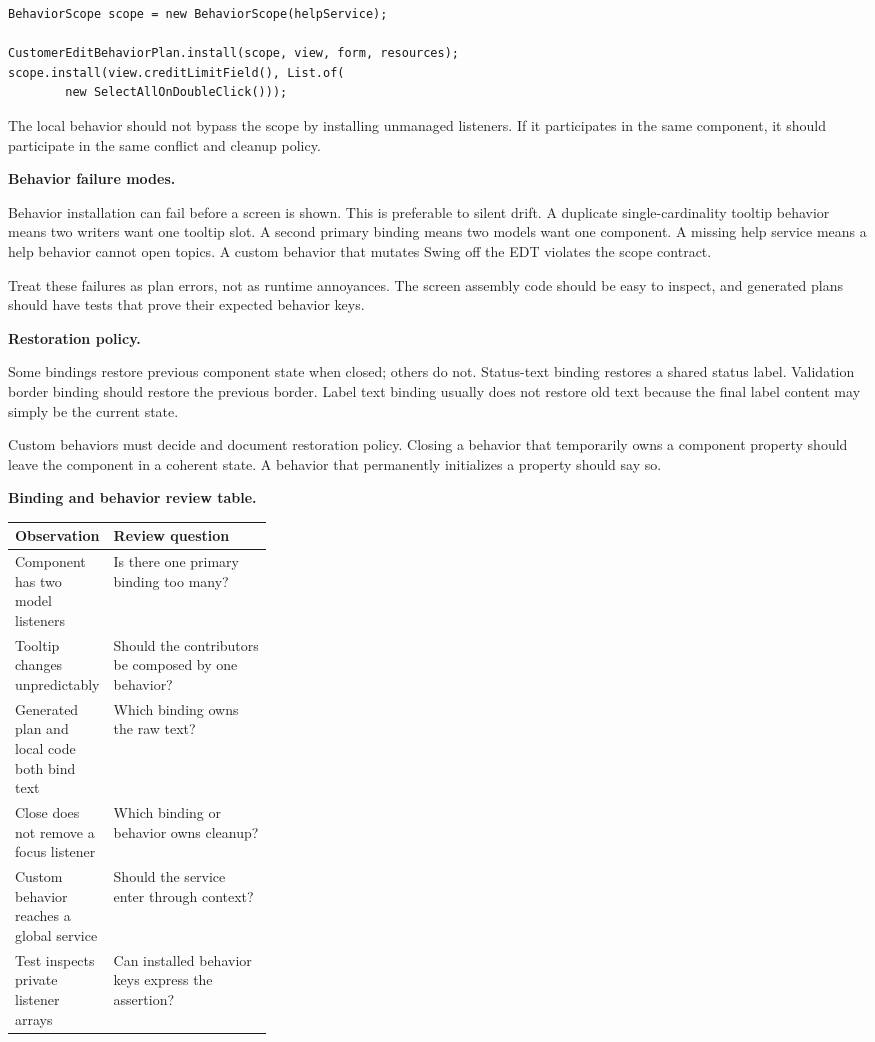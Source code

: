 \begin{lstlisting}[caption={Generated plan plus one local behavior.}]
BehaviorScope scope = new BehaviorScope(helpService);

CustomerEditBehaviorPlan.install(scope, view, form, resources);
scope.install(view.creditLimitField(), List.of(
        new SelectAllOnDoubleClick()));
\end{lstlisting}

The local behavior should not bypass the scope by installing unmanaged
listeners. If it participates in the same component, it should participate in
the same conflict and cleanup policy.

\textbf{Behavior failure modes.}

Behavior installation can fail before a screen is shown. This is preferable to
silent drift. A duplicate single-cardinality tooltip behavior means two writers
want one tooltip slot. A second primary binding means two models want one
component. A missing help service means a help behavior cannot open topics. A
custom behavior that mutates Swing off the EDT violates the scope contract.

Treat these failures as plan errors, not as runtime annoyances. The screen
assembly code should be easy to inspect, and generated plans should have tests
that prove their expected behavior keys.

\textbf{Restoration policy.}

Some bindings restore previous component state when closed; others do not.
Status-text binding restores a shared status label. Validation border binding
should restore the previous border. Label text binding usually does not restore
old text because the final label content may simply be the current state.

Custom behaviors must decide and document restoration policy. Closing a
behavior that temporarily owns a component property should leave the component
in a coherent state. A behavior that permanently initializes a property should
say so.

\begin{center}
\textbf{Binding and behavior review table.}
\end{center}

\noindent\begin{tabularx}{\linewidth}{@{}p{0.30\linewidth}X@{}}
\toprule
Observation & Review question\\
\midrule
Component has two model listeners & Is there one primary binding too many?\\
Tooltip changes unpredictably & Should the contributors be composed by one behavior?\\
Generated plan and local code both bind text & Which binding owns the raw text?\\
Close does not remove a focus listener & Which binding or behavior owns cleanup?\\
Custom behavior reaches a global service & Should the service enter through context?\\
Test inspects private listener arrays & Can installed behavior keys express the assertion?\\
\bottomrule
\end{tabularx}

